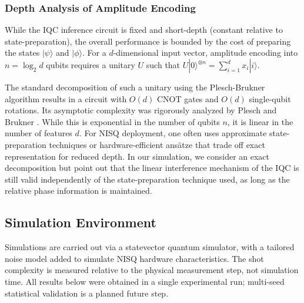 \documentclass[conference]{IEEEtran}
\begin{document}
\subsubsection{Depth Analysis of Amplitude Encoding}
While the IQC inference circuit is fixed and short-depth (constant relative to state-preparation), the overall performance is bounded by the cost of preparing the states $|\psi\rangle$ and $|\phi\rangle$. For a $d$-dimensional input vector, amplitude encoding into $n = \log_2 d$ qubits requires a unitary $U$ such that $U|0\rangle^{\otimes n} = \sum_{i=1}^d x_i |i\rangle$.

The standard decomposition of such a unitary using the Plesch-Brukner algorithm results in a circuit with $O(d)$ CNOT gates and $O(d)$ single-qubit rotations. Its asymptotic complexity was rigorously analyzed by Plesch and Brukner \cite{plesch2011quantum}. While this is exponential in the number of qubits $n$, it is linear in the number of features $d$. For NISQ deployment, one often uses approximate state-preparation techniques or hardware-efficient ans\"atze that trade off exact representation for reduced depth. In our simulation, we consider an exact decomposition but point out that the linear interference mechanism of the IQC is still valid independently of the state-preparation technique used, as long as the relative phase information is maintained.

\subsection{Simulation Environment}
Simulations are carried out via a statevector quantum simulator, with a tailored noise model added to simulate NISQ hardware characteristics. The shot complexity is measured relative to the physical measurement step, not simulation time. All results below were obtained in a single experimental run; multi-seed statistical validation is a planned future step.
\end{document}
